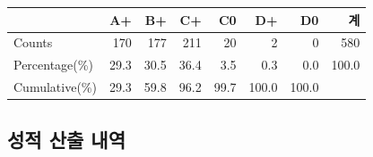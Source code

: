 \documentclass[
]{article}
\newcounter{none} %
\begin{document}
{\def\LTcaptype{none} %
\begin{longtable}[]{@{}lrrrrrrr@{}}
\toprule\noalign{}
& A+ & B+ & C+ & C0 & D+ & D0 & 계 \\
\midrule\noalign{}
\endhead
\bottomrule\noalign{}
\endlastfoot
Counts & 170 & 177 & 211 & 20 & 2 & 0 & 580 \\
Percentage(\%) & 29.3 & 30.5 & 36.4 & 3.5 & 0.3 & 0.0 & 100.0 \\
Cumulative(\%) & 29.3 & 59.8 & 96.2 & 99.7 & 100.0 & 100.0 & \\
\end{longtable}
}

\newpage

\subsection{성적 산출
내역}\label{uxc131uxc801-uxc0b0uxcd9c-uxb0b4uxc5ed}
\end{document}
